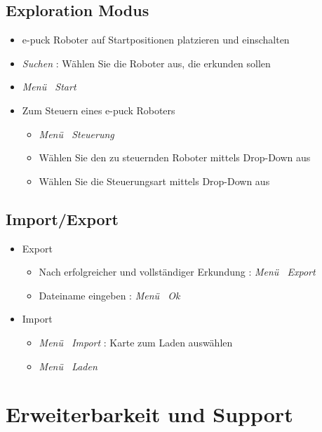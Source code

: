 \documentclass[10pt,a4paper]{article}
\let\oldsection\section
\renewcommand{\section}{\newpage \oldsection}
\begin{document}
	\subsection{Exploration Modus}
		\begin{itemize}
			\item{e-puck Roboter auf Startpositionen platzieren und einschalten}
			\item{\textit{Suchen} : W\"ahlen Sie die Roboter aus, die erkunden sollen}			
			\item{\textit{Men\"u \frq \frq \ Start}}
			\item{Zum Steuern eines e-puck Roboters}
			\begin{itemize}
				\item{\textit{Men\"u \frq \frq \ Steuerung}}
				\item{W\"ahlen Sie den zu steuernden Roboter mittels Drop-Down aus}
				\item{W\"ahlen Sie die Steuerungsart mittels Drop-Down aus}
			\end{itemize}
		\end{itemize}
	\subsection{Import/Export}
		\begin{itemize}
			\item{Export}
				\begin{itemize}
					\item{Nach erfolgreicher und vollst\"andiger Erkundung : \textit{Men\"u \frq \frq \ Export}}
					\item{Dateiname eingeben : \textit{Men\"u \frq \frq \ Ok}}
				\end{itemize}
			\item{Import}			
				\begin{itemize}
					\item{\textit{Men\"u \frq \frq \ Import} : Karte zum Laden ausw\"ahlen}
					\item{\textit{Men\"u \frq \frq \ Laden}}
				\end{itemize}
		\end{itemize}
\section{Erweiterbarkeit und Support}
\end{document}
